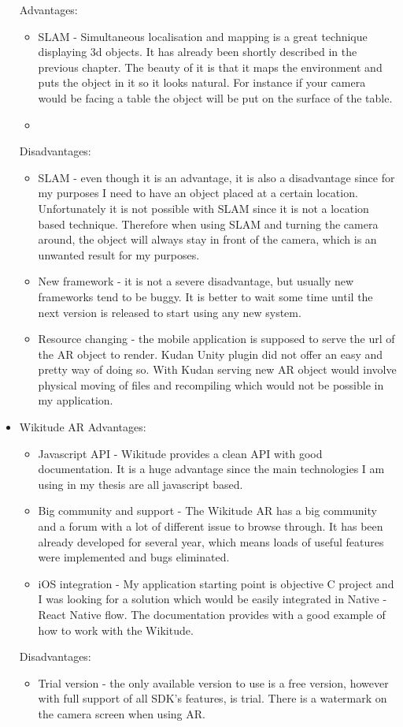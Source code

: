 \documentclass[thesis=M,english]{FITthesis}[2012/10/20]
\begin{document}
\begin{itemize}
	Advantages:
	\begin{itemize}
		\item{SLAM} - Simultaneous localisation and mapping is a great technique displaying 3d objects. It has already been shortly described in the previous chapter. The beauty of it is that it maps the environment and puts the object in it so it looks natural. For instance if your camera would be facing a table the object will be put on the surface of the table.
		\item{}
		
	\end{itemize}
	
	Disadvantages:
	\begin{itemize}
		\item{SLAM} - even though it is an advantage, it is also a disadvantage since for my purposes I need to have an object placed at a certain location. Unfortunately it is not possible with SLAM since it is not a location based technique. Therefore when using SLAM and turning the camera around, the object will always stay in front of the camera, which is an unwanted result for my purposes.
		\item{New framework} - it is not a severe disadvantage, but usually new frameworks tend to be buggy. It is better to wait some time until the next version is released to start using any new system.
		\item{Resource changing} - the mobile application is supposed to serve the url of the AR object to render. Kudan Unity plugin did not offer an easy and pretty way of doing so. With Kudan serving new AR object would involve physical moving of files and recompiling which would not be possible in my application.
	\end{itemize}	
	\item{Wikitude AR}
	Advantages:
	\begin{itemize}
		\item{Javascript API} - Wikitude provides a clean API with good documentation. It is a huge advantage since the main technologies I am using in my thesis are all javascript based.
		\item{Big community and support} - The Wikitude AR has a big community and a forum with a lot of different issue to browse through. It has been already developed for several year, which means loads of useful features were implemented and bugs eliminated.
		\item{iOS integration} - My application starting point is objective C project and I was looking for a solution which would be easily integrated in Native - React Native flow. The documentation provides with a good example of how to work with the Wikitude.
		\			
	\end{itemize}
	
	Disadvantages:
	\begin{itemize}
		\item{Trial version} - the only available version to use is a free version, however with full support of all SDK's features, is trial. There is a watermark on the camera screen when using AR.
	\end{itemize}		
\end{itemize}
\end{document}
